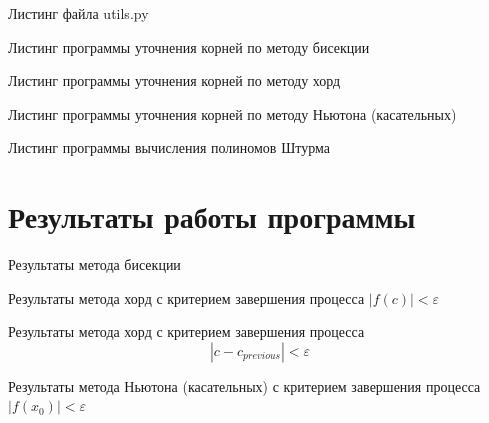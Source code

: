 Листинг файла utils.py
\lstset{inputencoding=utf8, extendedchars=\true}


Листинг программы уточнения корней по методу бисекции
\lstset{inputencoding=utf8, extendedchars=\true}


Листинг программы уточнения корней по методу хорд
\lstset{inputencoding=utf8, extendedchars=\true}


Листинг программы уточнения корней по методу Ньютона (касательных)
\lstset{inputencoding=utf8, extendedchars=\true}


Листинг программы вычисления полиномов Штурма
\lstset{inputencoding=utf8, extendedchars=\true}


\chapter{Результаты работы программы}

Результаты метода бисекции
\lstset{inputencoding=utf8, extendedchars=\true}


Результаты метода хорд с критерием завершения процесса $ \left| f \left( c \right) \right| < \varepsilon $
\lstset{inputencoding=utf8, extendedchars=\true}


Результаты метода хорд с критерием завершения процесса
$$\left| c - c_{previous} \right| < \varepsilon $$
\lstset{inputencoding=utf8, extendedchars=\true}


Результаты метода Ньютона (касательных) с критерием завершения процесса $ \left| f \left( x_0 \right) \right| < \varepsilon $
\lstset{inputencoding=utf8, extendedchars=\true}


